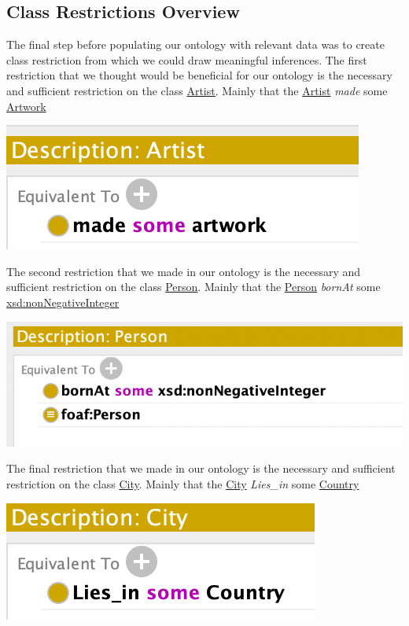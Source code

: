 \documentclass{article}
\begin{document}
\subsection{Class Restrictions Overview} 
The final step before populating our ontology with relevant data was to create class restriction from which we could draw meaningful inferences. 
\newline
\newline
The first restriction that we thought would be beneficial for our ontology is the necessary and sufficient restriction on the class \underline{Artist}. Mainly that the \underline{Artist} \textit{made} some
\underline{Artwork}
\begin{center}
\includegraphics[scale=0.5]{first_restriction.png}
\end{center}
\newline
\newline
The second restriction that we made in our ontology is the necessary and sufficient restriction on the class
\underline{Person}. Mainly that the \underline{Person} \textit{bornAt} some
\underline{xsd:nonNegativeInteger}
\begin{center}
\includegraphics[scale=0.35]{second_restriction.png}
\end{center}
\newline
\newline
The final restriction that we made in our ontology is the necessary and sufficient restriction on the class
\underline{City}. Mainly that the \underline{City} \textit{Lies\_in} some
\underline{Country}
\begin{center}
\includegraphics[scale=0.5]{third_restriction.png}
\end{center}
\end{document}
